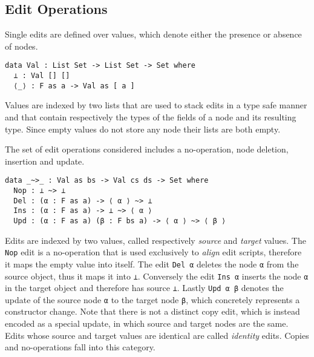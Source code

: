 \documentclass[preprint]{sigplanconf}
\begin{document}
	\subsection{Edit Operations}
	Single edits are defined over values, which denote either the presence or 
	absence of nodes. 
\begin{verbatim}
data Val : List Set -> List Set -> Set where
  ⊥ : Val [] []
  ⟨_⟩ : F as a -> Val as [ a ] 
\end{verbatim}
	Values are indexed by two lists that are used to stack edits in a type 
	safe manner and	that contain respectively the types of the fields of a node 
	and its resulting type.
	Since empty values do not store any node their lists are both empty.

	The set of edit operations considered includes a no-operation, node 
	deletion, insertion and update.
\begin{verbatim}
data _~>_ : Val as bs -> Val cs ds -> Set where
  Nop : ⊥ ~> ⊥
  Del : (α : F as a) -> ⟨ α ⟩ ~> ⊥
  Ins : (α : F as a) -> ⊥ ~> ⟨ α ⟩
  Upd : (α : F as a) (β : F bs a) -> ⟨ α ⟩ ~> ⟨ β ⟩
\end{verbatim}
	Edits are indexed by two values, called respectively 
	\emph{source} and \emph{target} values. The \texttt{Nop} edit is 
	a no-operation that is used exclusively to \emph{align} edit scripts,
	therefore it maps the empty value into itself.
	The edit \texttt{Del α} deletes the node \texttt{α} from the source object, 
	thus it maps it into \texttt{⊥}. Conversely the edit \texttt{Ins α} 
	inserts the node \texttt{α} in the target object and therefore has source 
	\texttt{⊥}.
	Lastly \texttt{Upd α β} denotes the update of the source node \texttt{α}
	to the target node \texttt{β}, which concretely represents a 
	constructor change. 
	Note that there is not a distinct copy edit, which is instead encoded as a 
	special	update, in which source and target nodes are the same.
	Edits whose source and target values are identical are 
	called \emph{identity} edits. Copies and no-operations fall into this
	category.
	
\end{document}
